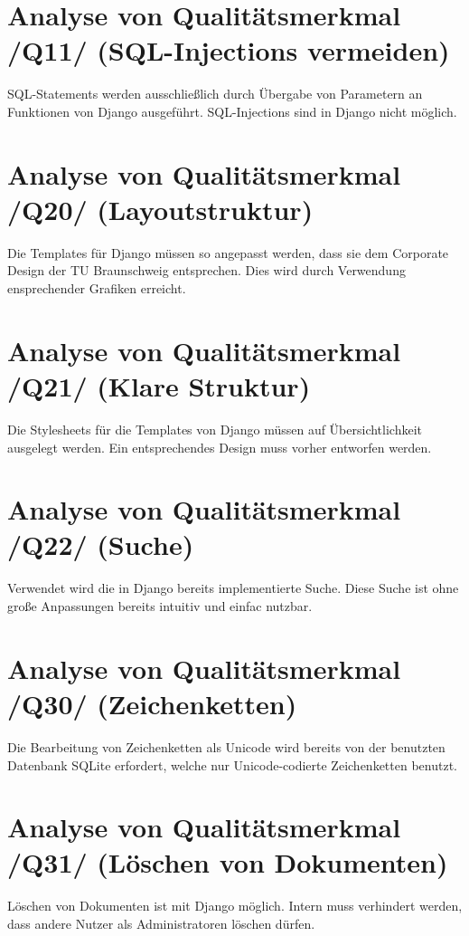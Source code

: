\section{Analyse von Qualitätsmerkmal /Q11/ (SQL-Injections vermeiden)}
SQL-Statements werden ausschließlich durch Übergabe von Parametern an Funktionen von Django ausgeführt. SQL-Injections sind in Django nicht möglich.
\section{Analyse von Qualitätsmerkmal /Q20/ (Layoutstruktur)}
Die Templates für Django müssen so angepasst werden, dass sie dem Corporate Design der TU Braunschweig entsprechen. Dies wird durch Verwendung ensprechender Grafiken erreicht.
\section{Analyse von Qualitätsmerkmal /Q21/ (Klare Struktur)}
Die Stylesheets für die Templates von Django müssen auf Übersichtlichkeit ausgelegt werden. Ein entsprechendes Design muss vorher entworfen werden.
\section{Analyse von Qualitätsmerkmal /Q22/ (Suche)}
Verwendet wird die in Django bereits implementierte Suche. Diese Suche ist ohne große Anpassungen bereits intuitiv und einfac nutzbar.
\section{Analyse von Qualitätsmerkmal /Q30/ (Zeichenketten)}
Die Bearbeitung von Zeichenketten als Unicode wird bereits von der benutzten Datenbank SQLite erfordert, welche nur Unicode-codierte Zeichenketten benutzt.
\section{Analyse von Qualitätsmerkmal /Q31/ (Löschen von Dokumenten)}
Löschen von Dokumenten ist mit Django möglich. Intern muss verhindert werden, dass andere Nutzer als Administratoren löschen dürfen.
